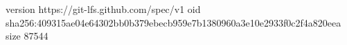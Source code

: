 version https://git-lfs.github.com/spec/v1
oid sha256:409315ae04e64302bb0b379ebecb959e7b1380960a3e10e2933f0c2f4a820eea
size 87544

